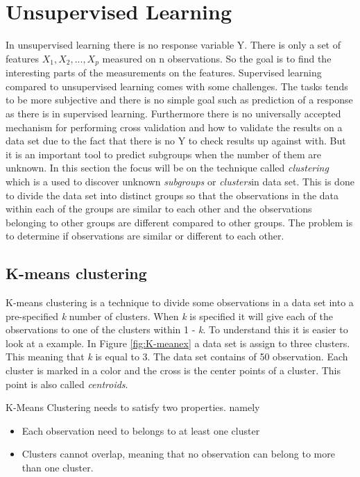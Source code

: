 \chapter{Unsupervised Learning}
\label{chp:unsuplea}
In unsupervised learning there is no response variable Y. There is only a set of features $X_1, X_2,..., X_p$ measured on n observations. So the goal is to find the interesting parts of the measurements on the features.
Supervised learning compared to unsupervised learning comes with some challenges. The tasks tends to be more subjective and there is no simple goal such as prediction of a response as there is in supervised learning. Furthermore there is no universally accepted mechanism for performing cross validation and how to validate the results on a data set due to the fact that there is no Y to check results up against with.
But it is an important tool to predict subgroups when the number of them are unknown.
In this section the focus will be on the  technique called \emph{clustering} which is a used to discover unknown \emph{subgroups} or \emph{clusters}in data set. This is done to divide the data set into distinct groups so that the observations in the data within each of the groups are similar to each other and the observations belonging to other groups are different compared to other groups. 
The problem is to determine if observations are similar or different to each other.
 
\section{K-means clustering}
\label{chp:clus}
K-means clustering is a technique to divide some observations in a data set into a pre-specified \emph{k} number of clusters. When \emph{k} is specified it will give each of the observations to one of the clusters within 1 - \emph{k}. To understand this it is easier to look at a example. In
Figure \ref{fig:K-meanex} a data set is assign to three clusters. This meaning that \emph{k} is equal to 3. The data set contains of 50 observation. Each cluster is marked in a color and the cross is the center points of a cluster. This point is also called \emph{centroids}.


K-Means Clustering needs to satisfy two properties. namely
\begin{itemize}
	\item Each observation need to belongs to at least one cluster
	\item Clusters cannot overlap, meaning that no observation can belong to more than one cluster.
\end{itemize} 

